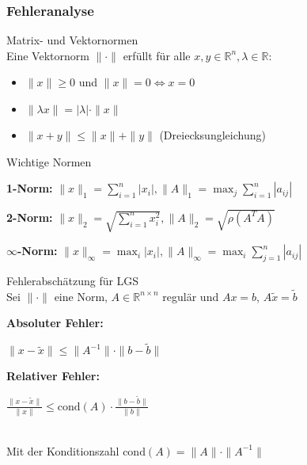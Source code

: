 \subsubsection{Fehleranalyse}

\begin{definition}{Matrix- und Vektornormen}\\
Eine Vektornorm $\|\cdot\|$ erfüllt für alle $x,y \in \mathbb{R}^n, \lambda \in \mathbb{R}$:
\begin{itemize}
    \item $\|x\| \geq 0$ und $\|x\| = 0 \Leftrightarrow x = 0$
    \item $\|\lambda x\| = |\lambda| \cdot \|x\|$
    \item $\|x + y\| \leq \|x\| + \|y\|$ (Dreiecksungleichung)
\end{itemize}
\end{definition}

\begin{concept}{Wichtige Normen}

\textbf{1-Norm:}
        $\|x\|_1 = \sum_{i=1}^n |x_i|,
        \|A\|_1 = \max_j \sum_{i=1}^n |a_{ij}|$

\textbf{2-Norm:}
        $\|x\|_2 = \sqrt{\sum_{i=1}^n x_i^2}, 
        \|A\|_2 = \sqrt{\rho(A^TA)}$

$\infty$\textbf{-Norm:}
        $\|x\|_\infty = \max_i |x_i|, 
        \|A\|_\infty = \max_i \sum_{j=1}^n |a_{ij}|$
\end{concept}

\begin{theorem}{Fehlerabschätzung für LGS}\\
Sei $\|\cdot\|$ eine Norm, $A \in \mathbb{R}^{n\times n}$ regulär und $Ax = b$, $A\tilde{x} = \tilde{b}$
\vspace{1mm}\\
\begin{minipage}[t]{0.47\textwidth}
    \textbf{Absoluter Fehler:}
    \vspace{-5mm}\\
    \begin{center}
        $\|x - \tilde{x}\| \leq \|A^{-1}\| \cdot \|b - \tilde{b}\|$
    \end{center}
\end{minipage}
\hspace{2mm}
\begin{minipage}[t]{0.47\textwidth}
    \textbf{Relativer Fehler:}
    \vspace{-5mm}\\
    \begin{center}
        $\frac{\|x - \tilde{x}\|}{\|x\|} \leq \text{cond}(A) \cdot \frac{\|b - \tilde{b}\|}{\|b\|}$
    \end{center}
\end{minipage}
\vspace{1mm}\\
Mit der Konditionszahl $\text{cond}(A) = \|A\| \cdot \|A^{-1}\|$
\end{theorem}

